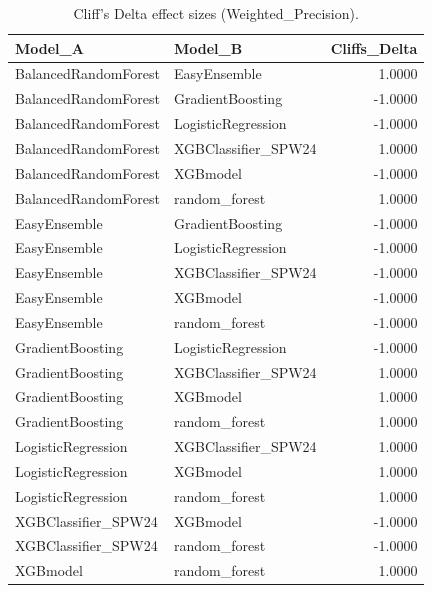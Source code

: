\begin{table}[t]
\centering
\begin{tabular}{llr}
\toprule
Model_A & Model_B & Cliffs_Delta \\
\midrule
BalancedRandomForest & EasyEnsemble & 1.0000 \\
BalancedRandomForest & GradientBoosting & -1.0000 \\
BalancedRandomForest & LogisticRegression & -1.0000 \\
BalancedRandomForest & XGBClassifier_SPW24 & 1.0000 \\
BalancedRandomForest & XGBmodel & -1.0000 \\
BalancedRandomForest & random_forest & 1.0000 \\
EasyEnsemble & GradientBoosting & -1.0000 \\
EasyEnsemble & LogisticRegression & -1.0000 \\
EasyEnsemble & XGBClassifier_SPW24 & -1.0000 \\
EasyEnsemble & XGBmodel & -1.0000 \\
EasyEnsemble & random_forest & -1.0000 \\
GradientBoosting & LogisticRegression & -1.0000 \\
GradientBoosting & XGBClassifier_SPW24 & 1.0000 \\
GradientBoosting & XGBmodel & 1.0000 \\
GradientBoosting & random_forest & 1.0000 \\
LogisticRegression & XGBClassifier_SPW24 & 1.0000 \\
LogisticRegression & XGBmodel & 1.0000 \\
LogisticRegression & random_forest & 1.0000 \\
XGBClassifier_SPW24 & XGBmodel & -1.0000 \\
XGBClassifier_SPW24 & random_forest & -1.0000 \\
XGBmodel & random_forest & 1.0000 \\
\bottomrule
\end{tabular}
\caption{Cliff's Delta effect sizes (Weighted_Precision).}
\label{tab:cliffs_Weighted_Precision}
\end{table}